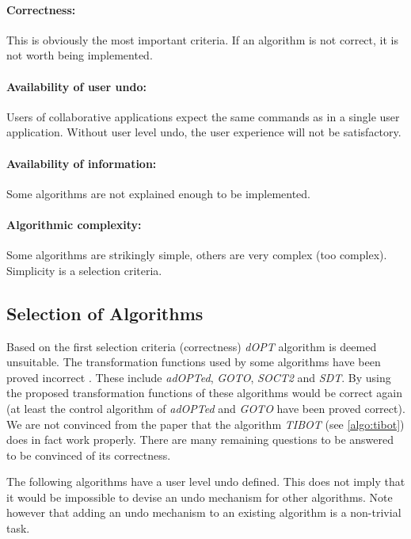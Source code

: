 \paragraph{Correctness:} This is obviously the most important criteria. If an algorithm is not correct, it is not worth being implemented.

\paragraph{Availability of user undo:} Users of collaborative applications expect the same commands as in a single user application. Without user level undo, the user experience will not be satisfactory.

\paragraph{Availability of information:} Some algorithms are not explained enough to be implemented.

\paragraph{Algorithmic complexity:} Some algorithms are strikingly simple, others are very complex (too complex). Simplicity is a selection criteria.


\subsection{Selection of Algorithms}

Based on the first selection criteria (correctness) \emph{dOPT} algorithm is deemed unsuitable. The transformation functions used by some algorithms have been proved incorrect \cite{imine04}. These include \emph{adOPTed}, \emph{GOTO}, \emph{SOCT2} and \emph{SDT}. By using the proposed transformation functions of \cite{imine04} these algorithms would be correct again (at least the control algorithm of \emph{adOPTed} and \emph{GOTO} have been proved correct). We are not convinced from the paper \cite{tibot} that the algorithm \emph{TIBOT} (see \ref{algo:tibot}) does in fact work properly. There are many remaining questions to be answered to be convinced of its correctness.

The following algorithms have a user level undo defined. This does not imply that it would be impossible to devise an undo mechanism for other algorithms. Note however that adding an undo mechanism to an existing algorithm is a non-trivial task.

